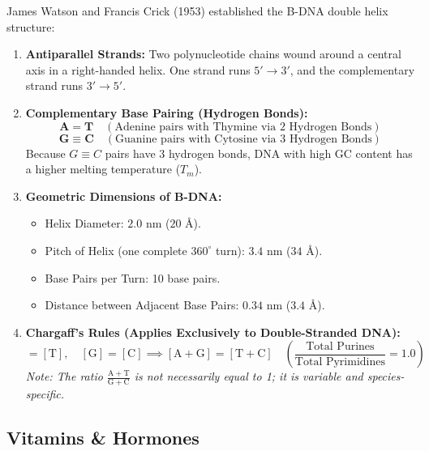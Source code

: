 \documentclass[10pt,twoside,openright]{book}
\begin{document}
\begin{formulabox}
James Watson and Francis Crick (1953) established the B-DNA double helix structure:
\begin{enumerate}[leftmargin=*]
  \item \textbf{Antiparallel Strands:} Two polynucleotide chains wound around a central axis in a right-handed helix. One strand runs $5' \to 3'$, and the complementary strand runs $3' \to 5'$.
  \item \textbf{Complementary Base Pairing (Hydrogen Bonds):}
  \begin{equation}
    \mathbf{A = T} \quad (\text{Adenine pairs with Thymine via 2 Hydrogen Bonds})
  \end{equation}
  \begin{equation}
    \mathbf{G \equiv C} \quad (\text{Guanine pairs with Cytosine via 3 Hydrogen Bonds})
  \end{equation}
  Because $G\equiv C$ pairs have 3 hydrogen bonds, DNA with high GC content has a higher melting temperature ($T_m$).
  \item \textbf{Geometric Dimensions of B-DNA:}
  \begin{itemize}
    \item Helix Diameter: $2.0\text{ nm}$ ($20\text{ \AA}$).
    \item Pitch of Helix (one complete $360^\circ$ turn): $3.4\text{ nm}$ ($34\text{ \AA}$).
    \item Base Pairs per Turn: 10 base pairs.
    \item Distance between Adjacent Base Pairs: $0.34\text{ nm}$ ($3.4\text{ \AA}$).
  \end{itemize}
  \item \textbf{Chargaff's Rules (Applies Exclusively to Double-Stranded DNA):}
  \begin{equation}
    [\mathrm{A}] = [\mathrm{T}], \quad [\mathrm{G}] = [\mathrm{C}] \implies [\mathrm{A} + \mathrm{G}] = [\mathrm{T} + \mathrm{C}] \quad \left(\frac{\text{Total Purines}}{\text{Total Pyrimidines}} = 1.0\right)
  \end{equation}
  \textit{Note: The ratio $\frac{\mathrm{A+T}}{\mathrm{G+C}}$ is not necessarily equal to 1; it is variable and species-specific.}
\end{enumerate}
\end{formulabox}

\subsection{Vitamins \& Hormones}
\end{document}
